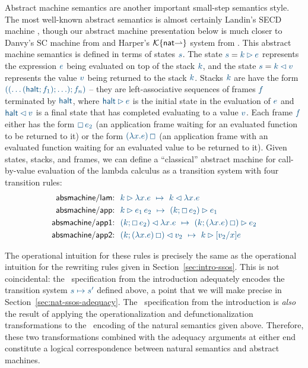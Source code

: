 Abstract machine semantics are another important small-step semantics
style. The most well-known abstract semantics is almost certainly
Landin's SECD machine \cite{landin64mechanical}, though our abstract
machine presentation below is much closer to Danvy's SC machine from
\cite{danvy03rational} and Harper's $\mathcal K\{{\sf
  nat}{\rightharpoonup}\}$ system from \cite[Chapter
27]{harper12practical}.  This abstract machine semantics is defined in
terms of states $\obj{s}$. The state $\obj{s} = \obj{k \rhd e}$
represents the expression $\obj{e}$ being evaluated on top of the
stack $\obj{k}$, and the state $\obj{s} = \obj{k \lhd v}$ represents
the value $\obj{v}$ being returned to the stack $\obj{k}$. Stacks
$\obj{k}$ are have the form $\obj{((\ldots({\sf halt}; f_1); \ldots);
  f_n)}$ -- they are left-associative sequences of frames $\obj{f}$
terminated by $\obj{\sf halt}$, where $\obj{{\sf halt} \rhd e}$ is the
initial state in the evaluation of $\obj{e}$ and 
$\obj{{\sf halt} \lhd v}$ is a final
state that has completed evaluating to a value 
$\obj{v}$.  Each frame $\obj{f}$ either has the form $\obj{\Box\,e_2}$
(an application frame waiting for an evaluated function to be returned
to it) or the form $\obj{(\lambda x.e)\,\Box}$ (an application frame
with an evaluated function waiting for an evaluated value to be
returned to it). Given states, stacks, and frames, we can define a
``classical'' abstract machine for call-by-value evaluation of the
lambda calculus as a transition system with four transition rules:
\begin{align*}
{\sf absmachine/lam}{:} & ~~ 
 \obj{k \rhd \lambda x.e ~ \mapsto ~ k \lhd \lambda x.e}
\\
{\sf absmachine/app}{:} & ~~ 
 \obj{k \rhd e_1\,e_2 ~ \mapsto ~ (k; \Box\,e_2) \rhd e_1}
\\
{\sf absmachine/app1}{:} & ~~ 
 \obj{(k; \Box\,e_2) \lhd \lambda x.e ~ 
   \mapsto ~ (k; (\lambda x.e)\,\Box) \rhd e_2}
\\
{\sf absmachine/app2}{:} & ~~
 \obj{(k; (\lambda x.e)\,\Box) \lhd v_2 ~ \mapsto ~ k \rhd [v_2/x]e}
\end{align*}

The operational intuition for these rules is precisely the same as the
operational intuition for the rewriting rules given in
Section~\ref{sec:intro-ssos}. This is not coincidental: the
\sls~specification from the introduction adequately encodes the
transition system $\obj{s \mapsto s'}$ defined above, a point that we will
make precise in Section~\ref{sec:nat-ssos-adequacy}. The
\sls~specification from the introduction is {\it also} the result of
applying the operationalization and defunctionalization
transformations to the \sls~encoding of the natural semantics given
above. Therefore, these two transformations combined with the adequacy
arguments at either end constitute a logical correspondence between
natural semantics and abstract machines. 

